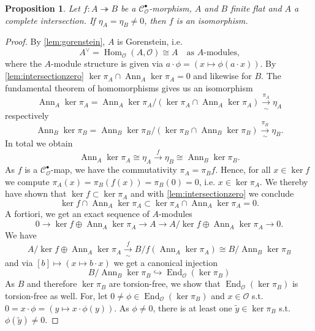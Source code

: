 \documentclass{article}
\theoremstyle{plain}%
\newtheorem{proposition}[theorem]{Proposition}
\theoremstyle{definition}
\theoremstyle{remark}
\newcommand{\cob}{\mathcal{C}_\mathcal{O}^\bullet}
\newcommand{\ann}{\operatorname{Ann}}
\renewcommand{\hom}{\operatorname{Hom}}
\begin{document}
\begin{proposition}\cite[theorem 5.24]{Darmon1995}\label{prop:eta_iso}
    Let \(f\colon A \twoheadrightarrow B\) be a \(\cob\)-morphism, \(A\) and \(B\) finite flat and \(A\) a 
    complete intersection. If \(\eta_A = \eta_B \neq 0\), then \(f\) is an isomorphism.
\end{proposition}
\begin{proof}
    By \cref{lem:gorenstein}, \(A\) is Gorenstein, i.e.
    \[
        A^\vee = \hom_\mathcal{O}(A, \mathcal{O}) \cong A \quad \text{as \(A\)-modules,} 
    \]
    where the \(A\)-module structure is given via \(a \cdot \phi = (x \mapsto \phi(a\cdot x))\).
    By \cref{lem:intersectionzero} \(\ker \pi_A \cap \ann_A \ker \pi_A = 0\) and likewise for \(B\).
    The fundamental theorem of homomorphisms gives us an isomorphism
    \[
        \ann_A \ker \pi_A = \ann_A \ker \pi_A/(\ker \pi_A \cap \ann_A \ker \pi_A) \xrightarrow[\sim]{\pi_A} \eta_A
    \]
    respectively
    \[
        \ann_B \ker \pi_B = \ann_B \ker \pi_B/(\ker \pi_B\cap \ann_B \ker \pi_B) \xrightarrow[\sim]{\pi_B} \eta_B.
    \]
    In total we obtain
    \[
        \ann_A \ker \pi_A \cong \eta_A \xrightarrow{f} \eta_B \cong \ann_B \ker \pi_B.  
    \]
    As \(f\) is a \(\cob\)-map, we have the commutativity \(\pi_A = \pi_Bf\). Hence, for all \(x\in \ker f\)
    we compute \(\pi_A(x) = \pi_B(f(x)) = \pi_B(0) = 0\), i.e. \(x \in \ker \pi_A\). We thereby have shown 
    that \(\ker f \subset \ker \pi_A\) and with \cref{lem:intersectionzero} we conclude
    \[
        \ker f \cap \ann_A \ker \pi_A \subset \ker \pi_A \cap \ann_A \ker \pi_A = 0.
    \]
    A fortiori, we get an exact sequence of \(A\)-modules
    \[
        0 \longrightarrow \ker f \oplus \ann_A \ker \pi_A \longrightarrow A 
        \longrightarrow A/\ker f \oplus \ann_A \ker \pi_A  \longrightarrow 0.
        \tag{\textasteriskcentered} \label{eq:ses}
    \]
    We have
    \[
        A/\ker f \oplus \ann_A \ker \pi_A \xrightarrow[\sim]{f} B/f(\ann_A \ker \pi_A) \cong B/\ann_B \ker \pi_B
    \]
    and via \([b] \mapsto (x \mapsto b\cdot x)\) we get a canonical injection
    \[
        B/\ann_B \ker \pi_B \hookrightarrow \operatorname{End}_\mathcal{O}(\ker \pi_B) 
    \]
    As \(B\) and therefore \(\ker \pi_B\) are torsion-free, we show that \(\operatorname{End}_\mathcal{O}(\ker \pi_B)\)
    is torsion-free as well. For, let \(0 \neq \phi \in \operatorname{End}_\mathcal{O}(\ker \pi_B)\) and 
    \(x \in \mathcal{O}\) s.t. \(0 = x \cdot \phi = (y \mapsto x \cdot \phi(y))\).
    As \(\phi \neq 0\), there is at least one \(\tilde y \in \ker \pi_B\) s.t. \(\phi(\tilde y) \neq 0\).

\end{proof}
\end{document}
